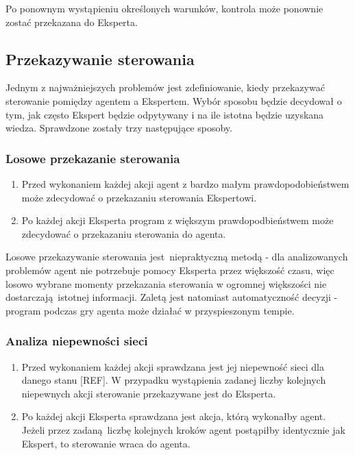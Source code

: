 Po ponownym wystąpieniu określonych warunków, kontrola może ponownie zostać przekazana do Eksperta.

\subsection{Przekazywanie sterowania}
Jednym z najważniejszych problemów jest zdefiniowanie, kiedy przekazywać sterowanie pomiędzy agentem a Ekspertem. Wybór sposobu będzie decydował o tym, jak często Ekspert będzie odpytywany i na ile istotna będzie uzyskana wiedza. Sprawdzone zostały trzy następujące sposoby.

\subsubsection{Losowe przekazanie sterowania}
\begin{enumerate}
\item Przed wykonaniem każdej akcji agent z bardzo małym prawdopodobieństwem może zdecydować o przekazaniu sterowania Ekspertowi.
\item Po każdej akcji Eksperta program z większym prawdopodbieństwem może zdecydować o przekazaniu sterowania do agenta.
\end{enumerate}

Losowe przekazywanie sterowania jest niepraktyczną metodą - dla analizowanych problemów agent nie potrzebuje pomocy Eksperta przez większość czasu, więc losowo wybrane momenty przekazania sterowania w ogromnej większości nie dostarczają istotnej informacji. Zaletą jest natomiast automatyczność decyzji - program podczas gry agenta może działać w przyspieszonym tempie.

\subsubsection{Analiza niepewności sieci}
\begin{enumerate}
\item Przed wykonaniem każdej akcji sprawdzana jest jej niepewność sieci dla danego stanu [REF]. W przypadku wystąpienia zadanej liczby kolejnych niepewnych akcji sterowanie przekazywane jest do Eksperta.
\item Po każdej akcji Eksperta sprawdzana jest akcja, którą wykonałby agent. Jeżeli przez zadaną liczbę kolejnych kroków agent postąpiłby identycznie jak Ekspert, to sterowanie wraca do agenta.
\end{enumerate}

